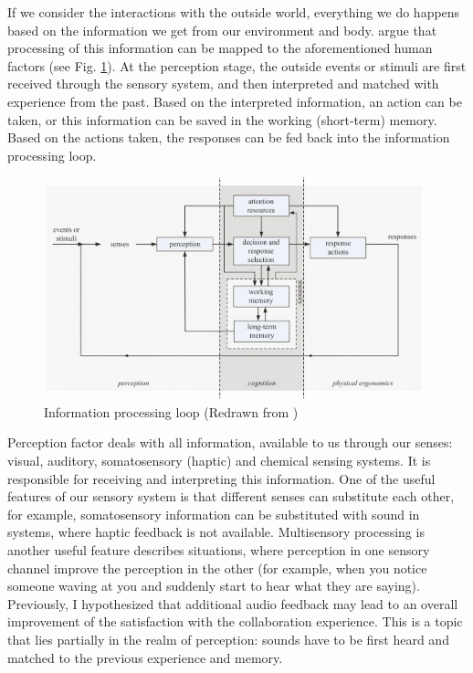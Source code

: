 
If we consider the interactions with the outside world, everything we do happens based on the information we get from our environment and body. \parencite{jr_3d_2017} argue that processing of this information can be mapped to the aforementioned human factors (see Fig. \ref{fig:informationprocessingloop}).
At the perception stage, the outside events or stimuli are first received through the sensory system, and then interpreted and matched with experience from the past. Based on the interpreted information, an action can be taken, or this information can be saved in the working (short-term) memory. 
Based on the actions taken, the responses can be fed back into the information processing loop.

\begin{figure}
	\centering
	\includegraphics[width=0.7\linewidth]{figures/placeholders/information_processing_loop}
	\caption{Information processing loop (Redrawn from \parencite{jr_3d_2017})}
	\label{fig:informationprocessingloop}
\end{figure}

Perception factor deals with all information, available to us through our senses: visual, auditory, somatosensory (haptic) and chemical sensing systems. It is responsible for receiving and interpreting this information.
One of the useful features of our sensory system is that different senses can substitute each other, for example, somatosensory information can be substituted with sound in systems, where haptic feedback is not available. Multisensory processing is another useful feature describes situations, where perception in one sensory channel improve the perception in the other (for example, when you notice someone waving at you and suddenly start to hear what they are saying).
Previously, I hypothesized that additional audio feedback may lead to an overall improvement of the satisfaction with the collaboration experience. This is a topic that lies partially in the realm of perception: sounds have to be first heard and matched to the previous experience and memory.

